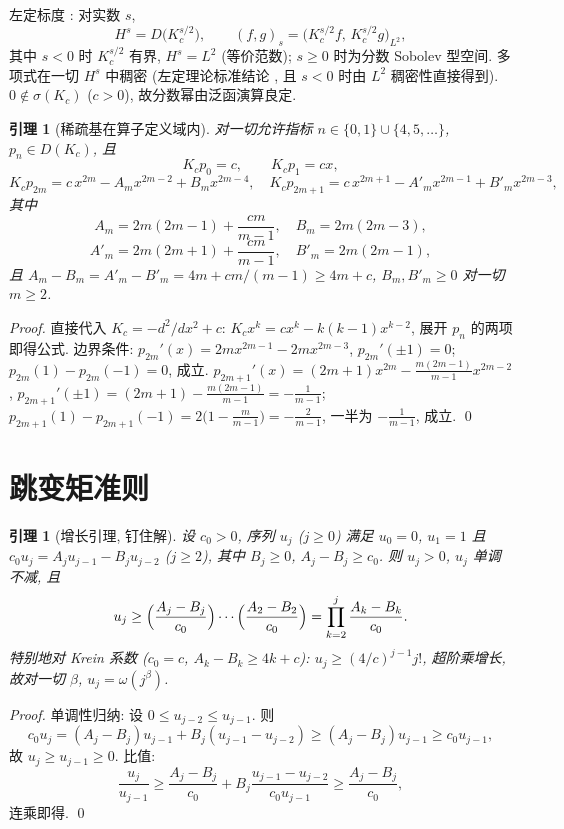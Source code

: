 \documentclass[UTF8]{ctexart}
\newtheorem{lemma}[theorem]{引理}
\begin{document}
左定标度 \cite{lw1,fg}: 对实数 $s$,
\[
	H^s = D\bigl(K_c^{s/2}\bigr), \qquad
	(f,g)_s = \bigl(K_c^{s/2}f,\, K_c^{s/2}g\bigr)_{L^2},
\]
其中 $s < 0$ 时 $K_c^{s/2}$ 有界, $H^s = L^2$ (等价范数);
$s \ge 0$ 时为分数 Sobolev 型空间. 多项式在一切 $H^s$ 中稠密
(左定理论标准结论 \cite{lw1}, 且 $s < 0$ 时由 $L^2$ 稠密性直接得到).
$0 \notin \sigma(K_c)$ ($c > 0$), 故分数幂由泛函演算良定.

\begin{lemma}[稀疏基在算子定义域内]\label{lem:domain}
	对一切允许指标 $n \in \{0,1\} \cup \{4,5,\dots\}$,
	$p_n \in D(K_c)$, 且
	\[
		K_c p_0 = c, \qquad K_c p_1 = c x,
	\]
	\[
		K_c p_{2m} = c\,x^{2m} - A_m x^{2m-2} + B_m x^{2m-4},
		\quad
		K_c p_{2m+1} = c\,x^{2m+1} - A'_m x^{2m-1} + B'_m x^{2m-3},
	\]
	其中
	\[
		A_m = 2m(2m-1) + \frac{cm}{m-1}, \quad B_m = 2m(2m-3),
	\]
	\[
		A'_m = 2m(2m+1) + \frac{cm}{m-1}, \quad B'_m = 2m(2m-1),
	\]
	且 $A_m - B_m = A'_m - B'_m = 4m + cm/(m-1) \ge 4m + c$,
	$B_m, B'_m \ge 0$ 对一切 $m \ge 2$.
\end{lemma}

\begin{proof}
	直接代入 $K_c = -d^2/dx^2 + c$:
	$K_c x^k = c x^k - k(k-1)x^{k-2}$, 展开 $p_n$ 的两项即得公式.
	边界条件: $p_{2m}'(x) = 2mx^{2m-1} - 2m x^{2m-3}$,
	$p_{2m}'(\pm1) = 0$; $p_{2m}(1) - p_{2m}(-1) = 0$, 成立.
	$p_{2m+1}'(x) = (2m+1)x^{2m} - \frac{m(2m-1)}{m-1}x^{2m-2}$,
	$p_{2m+1}'(\pm1) = (2m+1) - \frac{m(2m-1)}{m-1} = -\frac{1}{m-1}$;
	$p_{2m+1}(1) - p_{2m+1}(-1) = 2\bigl(1 - \frac{m}{m-1}\bigr)
	= -\frac{2}{m-1}$, 一半为 $-\frac{1}{m-1}$, 成立. \qed
\end{proof}

\section{跳变矩准则}

\begin{lemma}[增长引理, 钉住解]\label{lem:growth}
	设 $c_0 > 0$, 序列 $u_j$ ($j \ge 0$) 满足
	$u_0 = 0$, $u_1 = 1$ 且 $c_0 u_j = A_j u_{j-1} - B_j u_{j-2}$
	($j \ge 2$), 其中 $B_j \ge 0$, $A_j - B_j \ge c_0$.
	则 $u_j > 0$, $u_j$ 单调不减, 且
	\[
		u_j \ge \Bigl(\frac{A_j - B_j}{c_0}\Bigr) \cdots
		\Bigl(\frac{A_2 - B_2}{c_0}\Bigr)
		= \prod_{k=2}^j \frac{A_k - B_k}{c_0}.
	\]
	特别地对 Krein 系数 ($c_0 = c$, $A_k - B_k \ge 4k + c$):
	$u_j \ge (4/c)^{j-1} j!$, 超阶乘增长, 故对一切 $\beta$,
	$u_j = \omega(j^\beta)$.
\end{lemma}

\begin{proof}
	单调性归纳: 设 $0 \le u_{j-2} \le u_{j-1}$. 则
	\[
		c_0 u_j = (A_j - B_j)u_{j-1} + B_j(u_{j-1} - u_{j-2})
		\ge (A_j - B_j)u_{j-1} \ge c_0 u_{j-1},
	\]
	故 $u_j \ge u_{j-1} \ge 0$. 比值:
	\[
		\frac{u_j}{u_{j-1}} \ge \frac{A_j - B_j}{c_0} + B_j\frac{u_{j-1}-u_{j-2}}{c_0u_{j-1}}
		\ge \frac{A_j - B_j}{c_0},
	\]
	连乘即得. \qed
\end{proof}
\end{document}
